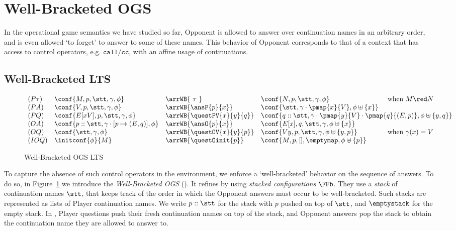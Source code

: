 \section{Well-Bracketed OGS}
\label{s:wb-ogs}

In the operational game semantics we have studied so far, Opponent is allowed to 
answer over continuation names in an arbitrary order, and is 
even allowed `to forget' to answer 
to some of these names.
This behavior of Opponent 
corresponds to that of a context that has 
access to control operators, e.g. $\mathtt{call/cc}$, with an affine usage of continuations.


\subsection{Well-Bracketed LTS}


\begin{figure}
\[\begin{array}{lllll}
 (P\tau) & \conf{M,p,\stt,\gamma,\phi} & \arrWB{\ \tau \ } & 
  \conf{N,p,\stt,\gamma,\phi} & \text{ when } M \red N\\
%
 (PA) & \conf{V,p,\stt,\gamma,\phi} & \arrWB{\ansP{p}{x}} & 
  \conf{\stt,\gamma \cdot \pmap{x}{V},\phi \uplus \{x\}} \\
%
 (PQ) & \conf{E[xV],p,\stt,\gamma,\phi} & \arrWB{\questPV{x}{y}{q}} & 
  \multicolumn{2}{c}
    {\conf{q::\stt,\gamma \cdot \pmap{y}{V}\cdot \pmap{q}{(E,p)},\phi \uplus \{y,q\}}} \\
%
 (OA) & \conf{p::\stt,\gamma\cdot [p \mapsto (E,q)],\phi} & \arrWB{\ansO{p}{x}} & 
  \conf{E[x],q,\stt,\gamma,\phi \uplus \{x\}} \\
%
 (OQ) & \conf{\stt,\gamma,\phi} & \arrWB{\questOV{x}{y}{p}} & 
  \conf{V y,p,\stt,\gamma,\phi \uplus \{y,p\}} & 
  \text{ when } \gamma(x) = V\\
%
 (IOQ) & \initconf{\phi}{M} & \arrWB{\questOinit{p}} &
     \conf{M,p,[],\emptymap,\phi \uplus \{p\}}
\end{array}\]
\caption{Well-Bracketed OGS LTS}
\label{fig:stacked-lts}
\end{figure}

To capture the absence of such control operators in the environment,
we enforce a `well-bracketed' behavior on the sequence of answers.
To do so, in Figure~\ref{fig:stacked-lts} we introduce the  \emph{Well-Bracketed OGS} (\WBOGS).  
It refines \AOGS by using \emph{stacked configurations} $\FFb$.
They use a \emph{stack} of continuation names $\stt$, that keeps track
of the order in which the Opponent answers must occur to be well-bracketed.
Such stacks
are represented as lists of Player continuation names.
We write $p:: \stt$ for the stack with $p$ pushed on top of $\stt$, 
and $\emptystack$ for the empty stack.
In \WBOGS, Player questions push their fresh continuation names on top of the stack, and
Opponent answers pop the stack to obtain the continuation name they are allowed to answer to.

